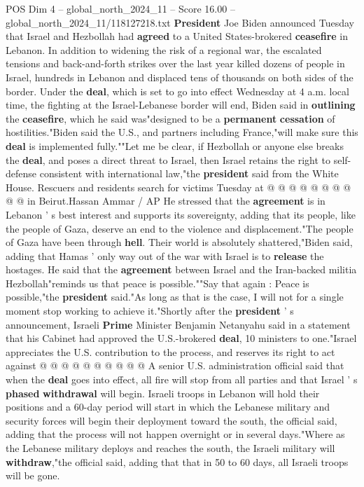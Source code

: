 \begin{textsample}{POS Dim 4 – global\_north\_2024\_11 – Score 16.00 – global\_north\_2024\_11/118127218.txt}  \label{ex:f4_pos_299}
\textbf{President} Joe Biden announced Tuesday that Israel and Hezbollah had \textbf{agreed} to a United States-brokered \textbf{ceasefire} in Lebanon.
In addition to widening the risk of a regional war, the escalated tensions and back-and-forth strikes over the last year killed dozens of people in Israel, hundreds in Lebanon and displaced tens of thousands on both sides of the border.
Under the \textbf{deal}, which is set to go into effect Wednesday at 4 a.m. local time, the fighting at the Israel-Lebanese border will end, Biden said in \textbf{outlining} the \textbf{ceasefire}, which he said was"designed to be a \textbf{permanent} \textbf{cessation} of hostilities."Biden said the U.S., and partners including France,"will make sure this \textbf{deal} is implemented fully.""Let me be clear, if Hezbollah or anyone else breaks the \textbf{deal}, and poses a direct threat to Israel, then Israel retains the right to self-defense consistent with international law,"the \textbf{president} said from the White House.
Rescuers and residents search for victims Tuesday at @ @ @ @ @ @ @ @ @ @ in Beirut.Hassan Ammar / AP He stressed that the \textbf{agreement} is in Lebanon ' s best interest and supports its sovereignty, adding that its people, like the people of Gaza, deserve an end to the violence and displacement."The people of Gaza have been through \textbf{hell}.
Their world is absolutely shattered,"Biden said, adding that Hamas ' only way out of the war with Israel is to \textbf{release} the hostages.
He said that the \textbf{agreement} between Israel and the Iran-backed militia Hezbollah"reminds us that peace is possible.""Say that again : Peace is possible,"the \textbf{president} said."As long as that is the case, I will not for a single moment stop working to achieve it."Shortly after the \textbf{president} ' s announcement, Israeli \textbf{Prime} Minister Benjamin Netanyahu said in a statement that his Cabinet had approved the U.S.-brokered \textbf{deal}, 10 ministers to one."Israel appreciates the U.S. contribution to the process, and reserves its right to act against @ @ @ @ @ @ @ @ @ @ A senior U.S. administration official said that when the \textbf{deal} goes into effect, all fire will stop from all parties and that Israel ' s \textbf{phased} \textbf{withdrawal} will begin.
Israeli troops in Lebanon will hold their positions and a 60-day period will start in which the Lebanese military and security forces will begin their deployment toward the south, the official said, adding that the process will not happen overnight or in several days."Where as the Lebanese military deploys and reaches the south, the Israeli military will \textbf{withdraw},"the official said, adding that that in 50 to 60 days, all Israeli troops will be gone.

\end{textsample}
